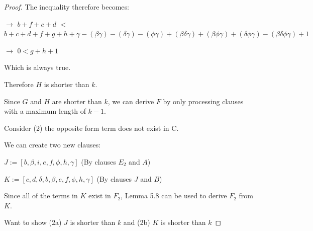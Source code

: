 \documentclass[manuscript]{acmart}
\begin{document}
\begin{proof}
        The inequality therefore becomes:

        $\rightarrow$
        $b + f + c + d$
        $<$
        $b + c + d + f + g + h 
        + \gamma
        - (\beta \gamma) - (\delta \gamma) - (\phi \gamma)
        + (\beta \delta \gamma) + (\beta \phi \gamma) + (\delta \phi \gamma)
        - (\beta \delta \phi \gamma)
        + 1
        $

        $\rightarrow$
        $0 < g + h + 1$

        Which is always true.

        Therefore $H$ is shorter than $k$.

        Since $G$ and $H$ are shorter than $k$, we can derive $F$
        by only processing clauses with a maximum length of $k-1$.

        Consider (2) the opposite form term does not exist in C.

        We can create two new clauses:

        $J := [b, \beta, i, e, f, \phi, h, \gamma]$ (By clauses $E_2$ and $A$)

        $K := [c, d, \delta, b, \beta, e, f, \phi, h, \gamma]$ (By clauses $J$ and $B$)

        Since all of the terms in $K$ exist in $F_2$, Lemma 5.8 can be used
        to derive $F_2$ from $K$.

        Want to show (2a) $J$ is shorter than $k$ and (2b) $K$ is shorter than $k$








\end{proof}
\end{document}
